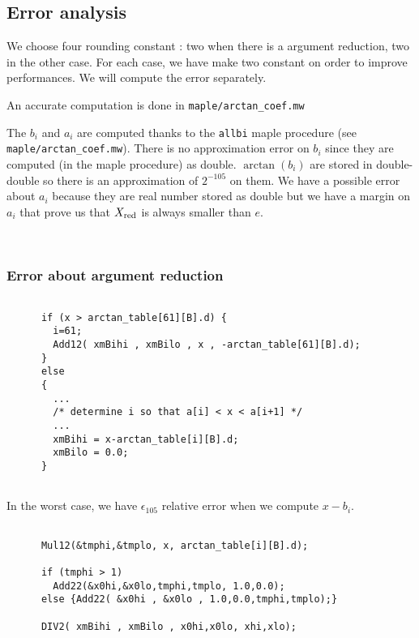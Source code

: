\subsection{Error analysis}

We choose four rounding constant : two when there is a argument reduction, two in
the other case. For each case, we have make two constant on order to
improve performances. We will compute the error separately.

An accurate computation is done in \texttt{maple/arctan\_coef.mw} 

The $b_i$ and $a_i$ are computed thanks to the \texttt{allbi} maple
procedure (see \texttt{maple/arctan\_coef.mw}). There is no approximation
error on $b_i$ since they are computed (in the maple procedure) as
double. $\arctan (b_i)$ are stored in double-double so there is an
approximation of $2^{-105}$ on them. We have a possible error about $a_i$
because they are real number stored as double but we have a margin on $a_i$
that prove us that $X_{\mathrm{red}}$ is always smaller than $e$.

\\
\subsubsection{Error about argument reduction}
\begin{lstlisting}[caption={Reduction part 1},firstnumber=1]

      if (x > arctan_table[61][B].d) {
        i=61;
        Add12( xmBihi , xmBilo , x , -arctan_table[61][B].d);
      }
      else
      {
        ...
        /* determine i so that a[i] < x < a[i+1] */
        ...          
        xmBihi = x-arctan_table[i][B].d;
        xmBilo = 0.0;
      }
      
\end{lstlisting}

In the worst case, we have $\epsilon_{105}$ relative error when we compute
$x-b_i$.

\begin{lstlisting}[caption={Reduction part 2},firstnumber=1]

      Mul12(&tmphi,&tmplo, x, arctan_table[i][B].d);

      if (tmphi > 1)
        Add22(&x0hi,&x0lo,tmphi,tmplo, 1.0,0.0);
      else {Add22( &x0hi , &x0lo , 1.0,0.0,tmphi,tmplo);}
      
      DIV2( xmBihi , xmBilo , x0hi,x0lo, xhi,xlo);

\end{lstlisting}

